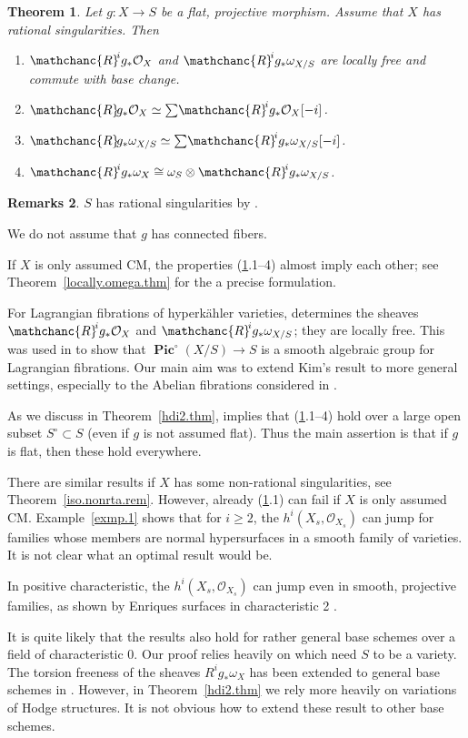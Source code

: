 \documentclass{amsart}
\newtheorem{thm}{Theorem}%
\theoremstyle{definition}
\newtheorem{rems}[thm]{Remarks}
\theoremstyle{remark}
\renewcommand{\o}[0]{{\mathcal O}}
\newcommand{\pics}[0]{\operatorname{\mathbf{Pic}}}
\newcommand{\tsum}[0]{\textstyle{\sum}}
\newcommand{\myR}{{\mathchanc{R}\!}}
\begin{document}
 \begin{thm} \label{lf.thm} Let $g:X\to S$ be a flat, projective morphism.   Assume that
   $X$ has rational singularities.
      Then
   \begin{enumerate}
   \item $\myR^ig_*\o_X$ and $\myR^ig_*\omega_{X/S}$ are locally free and commute with base change.
 \item $\myR g_*\o_X\simeq \tsum \myR^ig_*\o_X[-i]$.
 \item $\myR g_*\omega_{X/S}\simeq \tsum \myR^ig_*\omega_{X/S}[-i]$.
   \item $\myR^ig_*\omega_{X}\cong \omega_S\otimes \myR^ig_*\omega_{X/S}$.
     \end{enumerate} 
 \end{thm}

 
 \begin{rems}
  $S$ has rational singularities by \cite{BoutotRational}.
 
   We do not assume that $g$ has connected fibers.

 If $X$ is only assumed CM, the properties (\ref{lf.thm}.1--4) almost imply each other;  see Theorem~\ref{locally.omega.thm} for the a precise formulation.

 For Lagrangian fibrations of  hyperk\"ahler varieties,
\cite{MR2130616} determines the sheaves $\myR^ig_*\o_X$ and $\myR^ig_*\omega_{X/S}$; they are locally free. This was used in 
\cite{kim2024neronmodelhigherdimensionallagrangian} to show that 
$\pics^\circ(X/S)\to S$ is a smooth algebraic group for Lagrangian fibrations. Our main aim was to extend Kim's  result to  more general settings, especially to the
Abelian fibrations considered in \cite{k-neron, k-abtwist}. 
 
 As we discuss in Theorem~\ref{hdi2.thm},  \cite{k-hdi2} 
 implies that  (\ref{lf.thm}.1--4) hold over a large open subset
 $S^\circ\subset S$ (even if $g$ is not assumed flat). Thus the main  assertion is that if $g$ is flat, then these hold everywhere.

 There are similar results if  $X$ has some non-rational singularities, see Theorem~\ref{iso.nonrta.rem}. However,  already (\ref{lf.thm}.1) can fail if $X$ is only assumed CM.
Example~\ref{exmp.1} shows that for $i\geq 2$, the $h^i(X_s, \o_{X_s})$ can jump for families whose members are normal hypersurfaces in a smooth family of varieties.
It is not clear what an optimal result would be.

In positive characteristic, the $h^i(X_s, \o_{X_s})$ can jump even in smooth, projective families, as shown by Enriques surfaces in characteristic 2 \cite{MR491720}. 


It is quite likely that the results also hold for rather general base schemes over a field of characteristic 0. Our proof relies heavily on
\cite{k-hdi1, k-hdi2} which need $S$ to be a variety.
The torsion freeness of the sheaves  $R^ig_*\omega_X$ \cite[2.1]{k-hdi1}  has been extended to general base schemes in \cite{MR4945100, mur-van}. However, in Theorem~\ref{hdi2.thm} we rely more heavily on variations of Hodge structures. It is not obvious how to extend these result to other base schemes.
\end{rems}
\end{document}
